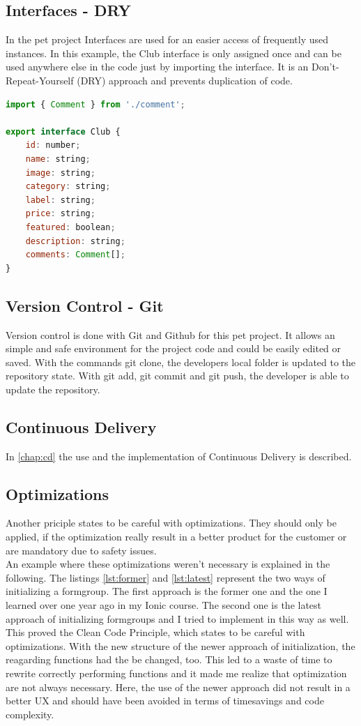 \documentclass[12pt]{article}
\begin{document}
\subsection{Interfaces - DRY}

In the pet project Interfaces are used for an easier access of frequently used instances. In this example, the Club interface is only assigned once and can be used anywhere else in the code just by importing the interface. It is an Don't-Repeat-Yourself (DRY) approach and prevents duplication of code.
\begin{lstlisting}[language=javascript]
import { Comment } from './comment';

export interface Club {
    id: number;
    name: string;
    image: string;
    category: string;
    label: string;
    price: string;
    featured: boolean;
    description: string;
    comments: Comment[];
}

\end{lstlisting}

\newpage
\subsection{Version Control - Git}

Version control is done with Git and Github for this pet project. It allows an simple and safe environment for the project code and could be easily edited or saved. With the commands git clone, the developers local folder is updated to the repository state. With git add, git commit and git push, the developer is able to update the repository.

\subsection{Continuous Delivery}
In \autoref{chap:cd} the use and the implementation of Continuous Delivery is described.


\subsection{Optimizations}

Another priciple states to be careful with optimizations. They should only be applied, if the optimization really result in a better product for the customer or are mandatory due to safety issues.\\
An example where these optimizations weren't necessary is explained in the following. 
The listings \autoref{lst:former} and \autoref{lst:latest} represent the two ways of initializing a formgroup. The first approach is the former one and the one I learned over one year ago in my Ionic course. The second one is the latest approach of initializing formgroups and I tried to implement in this way as well. This proved the Clean Code Principle, which states to be careful with optimizations. With the new structure of the newer approach of initialization, the reagarding functions had the be changed, too. This led to a waste of time to rewrite correctly performing functions and it made me realize that optimization are not always necessary. Here, the use of the newer approach did not result in a better UX and should have been avoided in terms of timesavings and code complexity.
\end{document}
